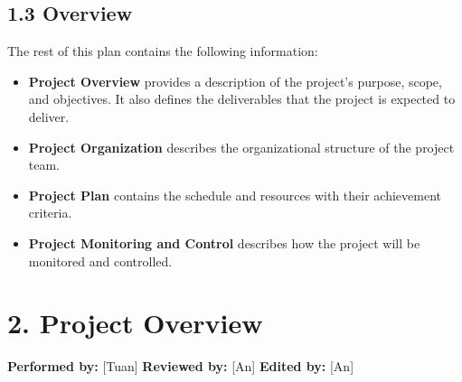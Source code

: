 \documentclass[12pt]{article}
\begin{document}
\subsection*{1.3 Overview}
\par\medskip
The rest of this plan contains the following information:
\par\medskip
\begin{itemize}
\item \textbf{Project Overview} provides a description of the project's purpose, scope, and objectives. It also defines the deliverables that the project is expected to deliver.
\par
\item \textbf{Project Organization} describes the organizational structure of the project team.
\par
\item \textbf{Project Plan} contains the schedule and resources with their achievement criteria.
\par
\item \textbf{Project Monitoring and Control} describes how the project will be monitored and controlled.
\par
\end{itemize}
\hypertarget{sec:2-project-overview}{}
\section*{2. Project Overview}
\par\medskip
\textbf{Performed by:} [Tuan] \textbar{} \textbf{Reviewed by:} [An] \textbar{} \textbf{Edited by:} [An]
\par\medskip
\hypertarget{sec:21-project-purpose-scope-and-objectives}{}
\end{document}
